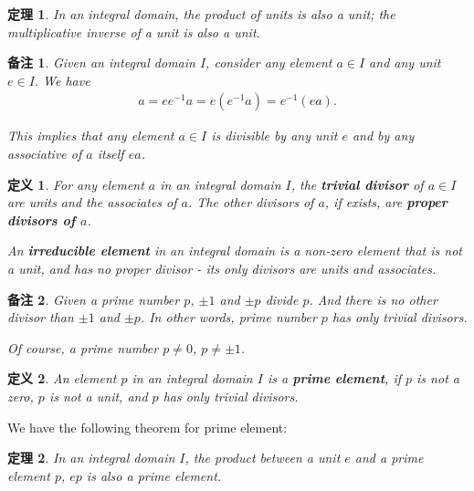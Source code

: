 \documentclass[utf8]{ctexbook}
\newtheorem{theorem}{定理}[section]
\newtheorem{definition}{定义}[section]
\newtheorem{memo}{备注}[section]
\begin{document}
\begin{theorem}\label{thm_integral_domain_unit_product_inverse}
In an integral domain, the product of units is also a unit; the multiplicative inverse of a unit is also a unit.
\end{theorem}

\begin{memo}
Given an integral domain $I$, consider any element $a \in I$ and any unit $e \in I$. We have
\begin{align*}
a = e e^{-1} a = e (e^{-1} a ) =  e^{-1} (e a) .
\end{align*}

This implies that any element $a \in I $ is divisible by any unit $e$ and by any associative of $a$ itself $e a$. 
\end{memo}

\begin{definition}\label{def_integral_domain_proper_divisor}
For any element $a$ in an integral domain $I$, the \textbf{trivial divisor} of $a \in I $ are units and the associates of $a$. The other divisors of $a$, if exists, are \textbf{proper divisors of $a$}.

An \textbf{irreducible element} in an integral domain is a non-zero element that is not a unit, and has no proper divisor - its only divisors are units and associates.

\end{definition}

\begin{memo}
Given a prime number $p$, $\pm 1$ and $\pm p$ divide $p$. And there is no other divisor than $\pm 1$ and $\pm p$. In other words, prime number $p$ has only trivial divisors. 

Of course, a prime number $p \neq 0$, $p \neq \pm 1$.
\end{memo}

\begin{definition}\label{def_integral_domain_prime_element}
An element $p$ in an integral domain $I$ is a \textbf{prime element}, if $p$ is not a zero, $p$ is not a unit, and $p$ has only trivial divisors. 
\end{definition}

We have the following theorem for prime element:

\begin{theorem}\label{integral_domain_unique_factorization_theorem_2}
In an integral domain $I$, the product between a unit $e$ and a prime element $p$, $e p$ is also a prime element.
\end{theorem}
\end{document}
